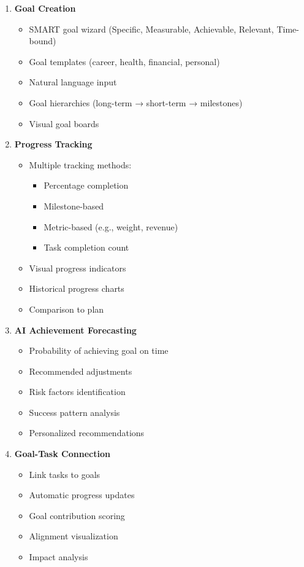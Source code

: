\begin{enumerate}
    \item \textbf{Goal Creation}
    \begin{itemize}
        \item SMART goal wizard (Specific, Measurable, Achievable, Relevant, Time-bound)
        \item Goal templates (career, health, financial, personal)
        \item Natural language input
        \item Goal hierarchies (long-term → short-term → milestones)
        \item Visual goal boards
    \end{itemize}
    
    \item \textbf{Progress Tracking}
    \begin{itemize}
        \item Multiple tracking methods:
        \begin{itemize}
            \item Percentage completion
            \item Milestone-based
            \item Metric-based (e.g., weight, revenue)
            \item Task completion count
        \end{itemize}
        \item Visual progress indicators
        \item Historical progress charts
        \item Comparison to plan
    \end{itemize}
    
    \item \textbf{AI Achievement Forecasting}
    \begin{itemize}
        \item Probability of achieving goal on time
        \item Recommended adjustments
        \item Risk factors identification
        \item Success pattern analysis
        \item Personalized recommendations
    \end{itemize}
    
    \item \textbf{Goal-Task Connection}
    \begin{itemize}
        \item Link tasks to goals
        \item Automatic progress updates
        \item Goal contribution scoring
        \item Alignment visualization
        \item Impact analysis
    \end{itemize}
    

\end{enumerate}
